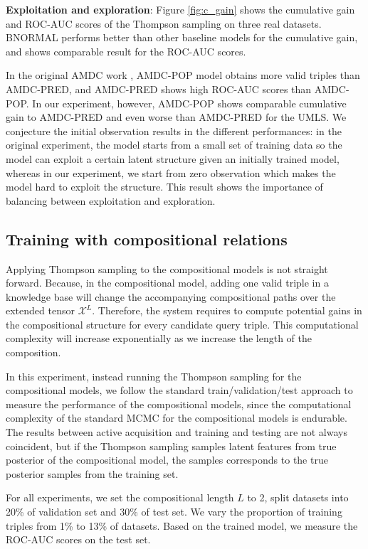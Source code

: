 \textbf{Exploitation and exploration}: 
Figure \ref{fig:c_gain} shows 
the cumulative gain and ROC-AUC scores of the Thompson sampling on three real datasets.
BNORMAL performs better than other baseline models for the cumulative gain, and shows comparable result for the ROC-AUC scores.

In the original AMDC work \cite{kajino2015active}, AMDC-POP model obtains more 
valid triples than AMDC-PRED, and AMDC-PRED shows high ROC-AUC scores than AMDC-POP. 
In our experiment, however, AMDC-POP shows comparable cumulative gain to AMDC-PRED 
and even worse than AMDC-PRED for the UMLS. We conjecture the initial observation 
results in the  different performances: in the original experiment, the model starts
from a small set of training data so the model can exploit a certain latent structure 
given an initially trained model, whereas in our experiment, we start from zero 
observation which makes the model hard to exploit the structure. This result shows 
the importance of balancing between exploitation and exploration.

\subsection{Training with compositional relations}
Applying Thompson sampling to the compositional models is not straight forward. 
Because, in the compositional model, adding one valid triple in a knowledge base will 
change the accompanying compositional paths over the extended tensor $\mathcal{X}^L$. 
Therefore, the system requires to compute potential gains in the 
compositional structure for every candidate query triple. This computational complexity 
will increase exponentially as we increase the length of the composition.

In this experiment, instead running the Thompson sampling for the compositional models,
we follow the standard train/validation/test approach to measure the performance of the compositional models, since the computational complexity of the standard MCMC for the compositional models is endurable. 
The results between active acquisition and training and testing are not always coincident, but if the Thompson sampling samples latent features from true posterior of the compositional model, the samples corresponds to the true posterior samples from the training set.

For all experiments, we set the compositional length $L$ to 2, split datasets into 20\% of validation set and 30\% of test set. We vary the proportion of training triples
from 1\% to 13\% of datasets. Based on the trained model, we measure the ROC-AUC scores on the test set.

